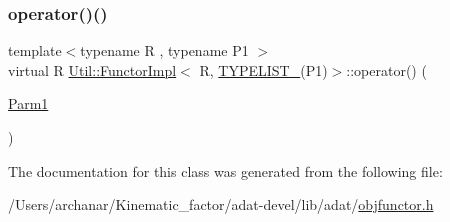 \subsubsection{\texorpdfstring{operator()()}{operator()()}\hspace{0.1cm}{\footnotesize\ttfamily [3/3]}}
{\footnotesize\ttfamily template$<$typename R , typename P1 $>$ \\
virtual R \mbox{\hyperlink{classUtil_1_1FunctorImpl}{Util\+::\+Functor\+Impl}}$<$ R, \mbox{\hyperlink{adat__devel__install_2include_2adat_2typelist_8h_a6a7a6aa3dece450c8d239713e2952df7}{T\+Y\+P\+E\+L\+I\+S\+T\+\_}}(P1)$>$\+::operator() (\begin{DoxyParamCaption}\item[{\mbox{\hyperlink{structUtil_1_1Private_1_1FunctorImplBase_a9d61e693d6c616dea5bd9d9073c7d21a}{Parm1}}}]{ }\end{DoxyParamCaption})\hspace{0.3cm}{\ttfamily [pure virtual]}}



The documentation for this class was generated from the following file\+:\begin{DoxyCompactItemize}
\item 
/\+Users/archanar/\+Kinematic\+\_\+factor/adat-\/devel/lib/adat/\mbox{\hyperlink{adat-devel_2lib_2adat_2objfunctor_8h}{objfunctor.\+h}}\end{DoxyCompactItemize}

